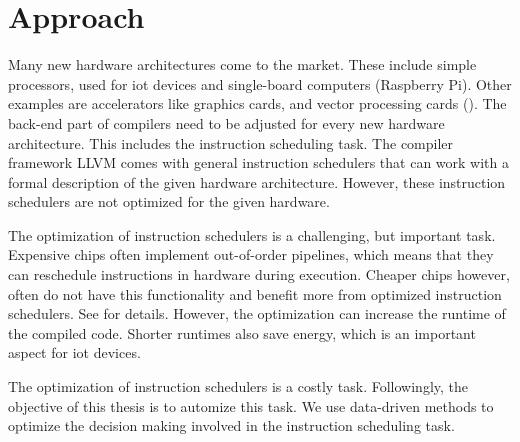 \chapter{Approach}

Many new hardware architectures come to the market.
These include simple processors, used for \ac{iot} devices and single-board computers (\eg Raspberry Pi).
Other examples are accelerators like graphics cards, and vector processing cards (\eg \aurora).
The back-end part of compilers need to be adjusted for every new hardware architecture.
This includes the instruction scheduling task.
The compiler framework LLVM comes with general instruction schedulers that can work with a formal description of the given hardware architecture.
However, these instruction schedulers are not optimized for the given hardware.

The optimization of instruction schedulers is a challenging, but important task.
Expensive chips often implement out-of-order pipelines, which means that they can reschedule instructions in hardware during execution.
Cheaper chips however, often do not have this functionality and benefit more from optimized instruction schedulers.
See  for details.
However, the optimization can increase the runtime of the compiled code.
Shorter runtimes also save energy, which is an important aspect for \ac{iot} devices.

The optimization of instruction schedulers is a costly task.
Followingly, the objective of this thesis is to automize this task.
We use data-driven methods to optimize the decision making involved in the instruction scheduling task.

